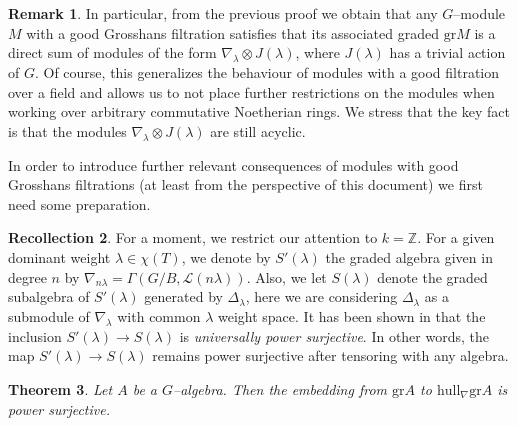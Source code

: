 \documentclass{article}
\theoremstyle{plain}
\newtheorem{Th}{Theorem}[section]
\theoremstyle{definition}
\newtheorem{Rem}[Th]{Remark}
\newtheorem{Rec}[Th]{Recollection}
\begin{document}
\begin{Rem}
In particular, from the previous proof we obtain that any  $G$--module $M$ with a good Grosshans filtration satisfies that its associated graded $\mathrm{gr}M$ is a direct sum of modules of the form $\nabla_\lambda\otimes J(\lambda) $, where $J(\lambda)$ has a trivial action of $G$. Of course, this generalizes the behaviour of modules with a good filtration over a field  and allows us to not place further restrictions on the modules when working over arbitrary  commutative Noetherian rings. We stress that the key fact is that the modules $\nabla_\lambda\otimes J(\lambda) $ are still acyclic.     
\end{Rem}





In order to introduce further  relevant consequences of modules with good Grosshans filtrations (at least from the perspective of this document) we first need some preparation. 

\begin{Rec}
 For a moment, we restrict our attention to  $k=\mathbb{Z}$. For a given dominant weight $\lambda\in \chi(T)$, we denote by $S'(\lambda)$ the graded algebra given in degree $n$ by $\nabla_{n\lambda}=\Gamma(G/B,\mathcal{L}(n\lambda))$. Also, we let $S(\lambda)$ denote the graded subalgebra of $S'(\lambda)$ generated by $\Delta_\lambda$, here we are considering $\Delta_\lambda$ as a submodule of $\nabla_\lambda$ with common $\lambda$ weight space. It has been shown in \cite[Lemma 39]{FvdK10} that the inclusion $S'(\lambda)\to S(\lambda)$ is \textit{universally power surjective}. In other words, the map $S'(\lambda)\to S(\lambda)$ remains power surjective after tensoring with any algebra.   
\end{Rec}

    

\begin{Th}\label{embedding is power surjective}
Let $A$ be a $G$--algebra. Then the embedding from $\mathrm{gr}A$ to  $\mathrm{hull}_\nabla \mathrm{gr}A$ is power surjective. 
\end{Th}
\end{document}
